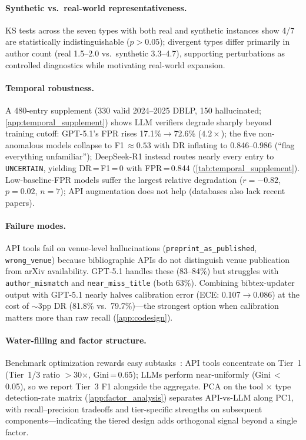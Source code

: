 \paragraph{Synthetic vs.\ real-world representativeness.}
\label{sec:synth_vs_real}
KS tests across the seven types with both real and synthetic instances show 4/7 are statistically indistinguishable ($p > 0.05$); divergent types differ primarily in author count (real 1.5--2.0 vs.\ synthetic 3.3--4.7), supporting perturbations as controlled diagnostics while motivating real-world expansion.

\paragraph{Temporal robustness.}
\label{sec:temporal_robustness}
A 480-entry supplement (330 valid 2024--2025 DBLP, 150 hallucinated; \cref{app:temporal_supplement}) shows LLM verifiers degrade sharply beyond training cutoff: GPT-5.1's FPR rises 17.1\%$\to$72.6\% ($4.2{\times}$); the five non-anomalous models collapse to F1\,${\approx}0.53$ with DR inflating to 0.846--0.986 (``flag everything unfamiliar''); DeepSeek-R1 instead routes nearly every entry to \texttt{UNCERTAIN}, yielding DR\,=\,F1\,=\,0 with FPR\,=\,0.844 (\cref{tab:temporal_supplement}).
Low-baseline-FPR models suffer the largest relative degradation ($r = -0.82$, $p = 0.02$, $n = 7$); API augmentation does not help (databases also lack recent papers).

\paragraph{Failure modes.}
\label{sec:failure}
API tools fail on venue-level hallucinations (\texttt{preprint\_as\_published}, \texttt{wrong\_venue}) because bibliographic APIs do not distinguish venue publication from arXiv availability.
GPT-5.1 handles these (83--84\%) but struggles with \texttt{author\_mismatch} and \texttt{near\_miss\_title} (both 63\%).
Combining bibtex-updater output with GPT-5.1 nearly halves calibration error (ECE: 0.107$\to$0.086) at the cost of ${\sim}3$pp DR (81.8\% vs.\ 79.7\%)---the strongest option when calibration matters more than raw recall (\cref{app:codesign}).

\paragraph{Water-filling and factor structure.}
\label{sec:water_filling}
Benchmark optimization rewards easy subtasks~\citep{hardt2025benchmarks}: API tools concentrate on Tier~1 (Tier~1/3 ratio $>$30$\times$, Gini\,=\,0.65); LLMs perform near-uniformly (Gini\,$<$\,0.05), so we report Tier~3 F1 alongside the aggregate.
PCA on the tool$\,\times\,$type detection-rate matrix (\cref{app:factor_analysis}) separates API-vs-LLM along PC1, with recall--precision tradeoffs and tier-specific strengths on subsequent components---indicating the tiered design adds orthogonal signal beyond a single factor.
